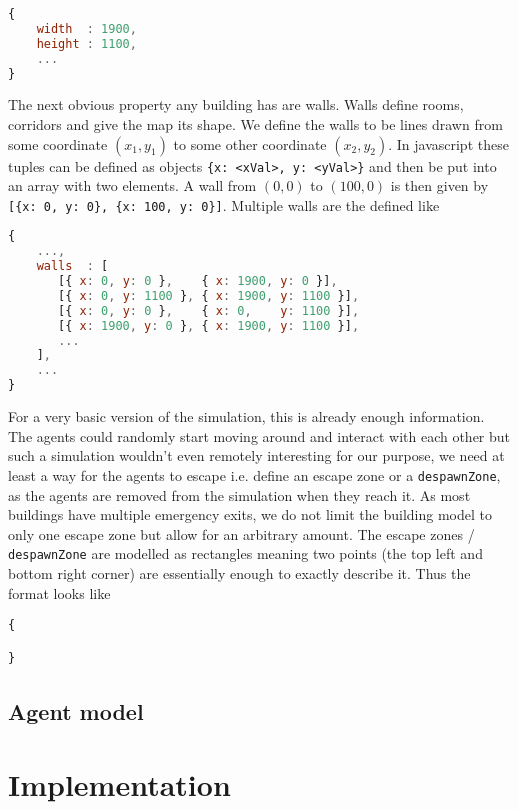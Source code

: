 \documentclass[11pt]{article}
\begin{document}
\begin{lstlisting}[language=javascript]
{
	width  : 1900,
	height : 1100,
	...
}
\end{lstlisting}

The next obvious property any building has are walls. Walls define rooms, corridors and give the map its shape. We define the walls to be lines drawn from some coordinate $(x_1, y_1)$ to some other coordinate $(x_2, y_2)$. In javascript these tuples can be defined as objects \texttt{\{x: <xVal>, y: <yVal>\}} and then be put into an array with two elements. A wall from $(0,0)$ to $(100, 0)$ is then given by \texttt{[\{x: 0, y: 0\}, \{x: 100, y: 0\}]}. Multiple walls are the defined like

\begin{lstlisting}[language=javascript]
{
    ...,
    walls  : [
       [{ x: 0, y: 0 },    { x: 1900, y: 0 }],
       [{ x: 0, y: 1100 }, { x: 1900, y: 1100 }],
       [{ x: 0, y: 0 },    { x: 0,    y: 1100 }],
       [{ x: 1900, y: 0 }, { x: 1900, y: 1100 }],
       ...
    ],
    ...
}
\end{lstlisting}

For a very basic version of the simulation, this is already enough information. The agents could randomly start moving around and interact with each other but such a simulation wouldn't even remotely interesting for our purpose, we need at least a way for the agents to escape i.e. define an escape zone or a \texttt{despawnZone}, as the agents are removed from the simulation when they reach it. As most buildings have multiple emergency exits, we do not limit the building model to only one escape zone but allow for an arbitrary amount. The escape zones / \texttt{despawnZone} are modelled as rectangles meaning two points (the top left and bottom right corner) are essentially enough to exactly describe it. Thus the format looks like

\begin{lstlisting}
{

}
\end{lstlisting}

\subsection{Agent model}

\section{Implementation}
\end{document}
